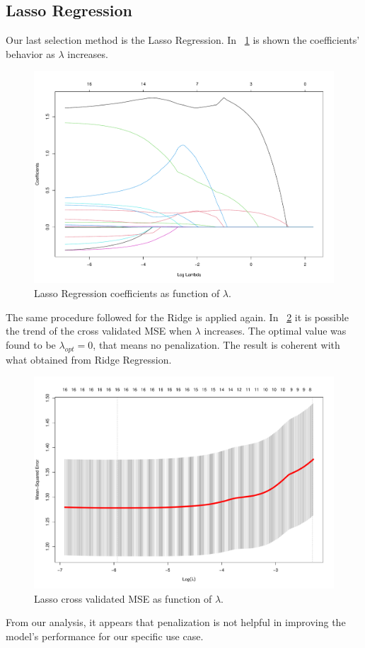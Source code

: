 \subsection{Lasso Regression}

Our last selection method is the Lasso Regression. In \Fig~\ref{fig:LassoCoefVsLambda} is shown the coefficients' behavior as $\lambda$ increases. 

\begin{figure}[h]
	\centering
	\includegraphics[width=0.4\linewidth]{ImageFiles/Regression/Lasso/LassoCoefVsLambda}
	\caption{Lasso Regression coefficients as function of $\lambda$.}
	\label{fig:LassoCoefVsLambda}
\end{figure}

The same procedure followed for the Ridge is applied again. In \Fig~\ref{fig:LassoCvPlot} it is possible the trend of the cross validated MSE when $\lambda$ increases. The optimal value was found to be $\lambda_{opt} = 0$, that means no penalization. The result is coherent with what obtained from Ridge Regression.

\begin{figure}[h]
	\centering
	\includegraphics[width=0.5\linewidth]{ImageFiles/Regression/Lasso/LassoCvPlot}
	\caption{Lasso cross validated MSE as function of $\lambda$.}
	\label{fig:LassoCvPlot}
\end{figure}

From our analysis, it appears that penalization is not helpful in improving the model's performance for our specific use case.